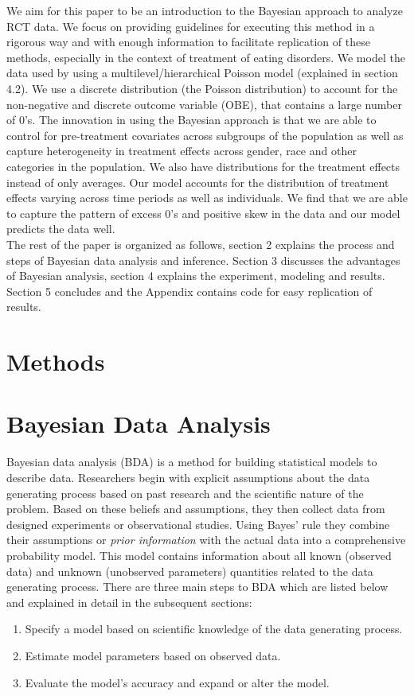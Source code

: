 \documentclass{article}
\begin{document}
We aim for this paper to be an introduction to the Bayesian approach to analyze RCT data. We focus on providing guidelines for executing this method in a rigorous way and with enough information to facilitate replication of these methods, especially in the context of treatment of eating disorders. We model the data used by  using a multilevel/hierarchical Poisson model (explained in section 4.2). We use a discrete distribution (the Poisson distribution)  to account for the non-negative and discrete outcome variable (OBE), that contains a large number of 0's. The innovation in using the Bayesian approach is that we are able to control for pre-treatment covariates across subgroups of the population as well as capture heterogeneity in treatment effects across gender, race and other categories in the population. We also have distributions for the treatment effects instead of only averages. Our model accounts for the distribution of treatment effects varying across time periods as well as individuals. We find that we are able to capture the pattern of excess 0's and positive skew in the data and our model predicts the data well. \\
The rest of the paper is organized as follows, section 2 explains the process and steps of Bayesian data analysis and inference. Section 3 discusses the advantages of Bayesian analysis, section 4 explains the experiment, modeling and results. Section 5 concludes and the Appendix contains code for easy replication of results.


\section{Methods}
\section*{Bayesian Data Analysis}
Bayesian data analysis (BDA) is a method for building statistical models to describe data.  Researchers begin with explicit assumptions about the data generating process based on past research and the scientific nature of the problem. Based on these beliefs and assumptions, they then collect data from designed experiments or observational studies. Using Bayes' rule they combine their assumptions or \textit{prior information} with the actual data into a comprehensive probability model. This model contains information about all known (observed data) and unknown (unobserved parameters) quantities related to the data generating process.
There are three main steps to BDA which are listed below and explained in detail in the subsequent sections:
\begin{enumerate}
\item Specify a model based on scientific knowledge of the data generating process.
\item Estimate model parameters based on observed data.
\item Evaluate the model's accuracy and expand or alter the model.
\end{enumerate}
\end{document}
